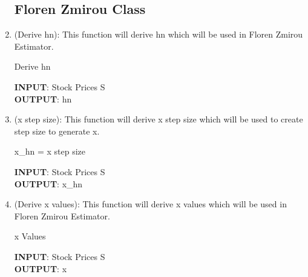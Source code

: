 \begin{enumerate}
\subsection{Floren Zmirou Class}
\item (Derive hn): This function will derive hn which will be used in Floren Zmirou Estimator.
\begin{algorithm}
\caption{Derive hn}
\bigskip
\textbf{INPUT}: Stock Prices S\\
\textbf{OUTPUT}: hn
\end{algorithm}
\item (x step size): This function will derive x step size which will be used  to create step size to generate x.
\begin{algorithm}
\caption{x\_hn = x step size}
\bigskip
\textbf{INPUT}: Stock Prices S\\
\textbf{OUTPUT}: x\_hn
\end{algorithm}
\item (Derive x values): This function will derive x values which will be used  in Floren Zmirou Estimator.
\begin{algorithm}
\caption { x Values}
\bigskip
\textbf{INPUT}: Stock Prices S\\
\textbf{OUTPUT}: x
\end{algorithm}
\end{enumerate}
